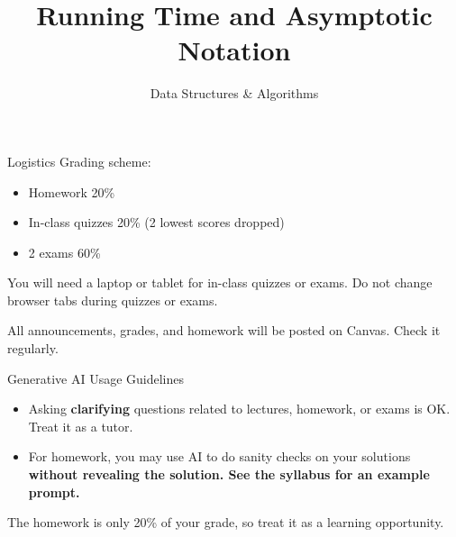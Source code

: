 \documentclass[10pt,aspectratio=169]{beamer}
\title{Running Time and Asymptotic Notation}
\subtitle{Data Structures \& Algorithms}
\date{}
\author{}
\begin{document}
\maketitle

\begin{frame}{Logistics}
  Grading scheme:

  \bigskip

  \begin{itemize}
    \item Homework 20\%
    \item In-class quizzes 20\% (2 lowest scores dropped)
    \item 2 exams 60\%
  \end{itemize}

  \pause

  \bigskip

  You will need a laptop or tablet for in-class quizzes or exams.
  Do not change browser tabs during quizzes or exams.  

  \pause 
   \bigskip

  All announcements, grades, and homework will be posted on Canvas. Check it regularly.



\end{frame}



\begin{frame}{Generative AI Usage Guidelines}


  \begin{itemize}
    \item Asking {\bf clarifying} questions related to lectures, homework, or exams is OK. Treat it as a tutor.
    \item For homework, you may use AI to do sanity checks on your solutions \bf{without} revealing the solution. See the syllabus for an example prompt.
  \end{itemize}

   The homework is only 20\% of your grade, so treat it as a learning opportunity.


\end{frame}
\end{document}
